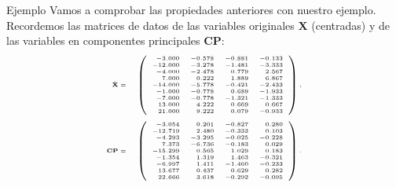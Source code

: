\documentclass[
  ignorenonframetext,
]{beamer}
\begin{document}
\begin{frame}{Ejemplo}
\protect\hypertarget{ejemplo-15}{}
Vamos a comprobar las propiedades anteriores con nuestro ejemplo.
Recordemos las matrices de datos de las variables originales
\(\mathbf{X}\) (centradas) y de las variables en componentes principales
\(\mathbf{CP}\): \[
{\tiny 
\begin{array}{rl}
\tilde{\mathbf{X}} =& 
\left(
\begin{array}{rrrr}
-3.000 & -0.578 & -0.881 & -0.133 \\
 -12.000 & -3.278 & -1.481 & -3.333 \\
 -4.000 & -2.478 & 0.779 & 2.567 \\
 7.000 & 0.222 & 1.889 & 6.867 \\
 -14.000 & -5.778 & -0.421 & -2.433 \\
 -1.000 & -0.778 & 0.689 & -1.933 \\
 -7.000 & -0.778 & -1.321 & -1.333 \\
 13.000 & 4.222 & 0.669 & 0.667 \\
 21.000 & 9.222 & 0.079 & -0.933 
\end{array}
\right) ,
\\ &\\
\mathbf{CP}= &
\left(
\begin{array}{rrrr}
-3.054 & 0.201 & -0.827 & 0.280 \\
 -12.719 & 2.480 & -0.333 & 0.103 \\
 -4.293 & -3.295 & -0.025 & -0.228 \\
 7.373 & -6.736 & -0.183 & 0.029 \\
 -15.299 & 0.565 & 1.029 & 0.183 \\
 -1.354 & 1.319 & 1.463 & -0.321 \\
 -6.997 & 1.411 & -1.460 & -0.233 \\
 13.677 & 0.437 & 0.629 & 0.282 \\
 22.666 & 3.618 & -0.292 & -0.095 
\end{array}
\right).
\end{array}}
\]
\end{frame}
\end{document}

